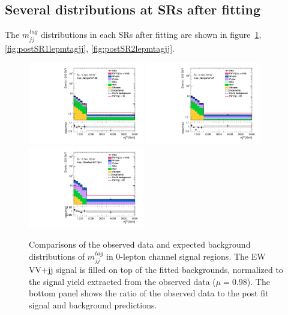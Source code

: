 \subsection{Several distributions at SRs after fitting}
The $m^{tag}_{jj}$ distributions in each SRs after fitting are shown in figure~\ref{fig:postSR0lepmtagjj}, \ref{fig:postSR1lepmtagjj}, \ref{fig:postSR2lepmtagjj}. 
\begin{figure}[]
    \centering
    \includegraphics[width=0.45\textwidth]{figures/PostFit/Region_distMTagJets_DSRVBSHP_BMin0_J0_incJet1_L0_T0_incFat1_Y6051_incTag1_Fat1_GlobalFit_unconditionnal_mu1log.pdf}
    \includegraphics[width=0.45\textwidth]{figures/PostFit/Region_distMTagJets_DSRVBSLP_BMin0_J0_incJet1_L0_T0_incFat1_Y6051_incTag1_Fat1_GlobalFit_unconditionnal_mu1log.pdf}
    \includegraphics[width=0.45\textwidth]{figures/PostFit/Region_distMTagJets_DSRVBSFid_BMin0_T0_Y6051_incTag1_J2_L0_incJet1_GlobalFit_unconditionnal_mu1log.pdf}
      \caption{Comparisons of the observed data and expected background distributions of $m^{tag}_{jj}$ in 0-lepton channel signal regions. The EW VV+jj signal is filled on top of the fitted backgrounds, normalized to the signal yield extracted from the observed data ($\mu = 0.98$). The bottom panel shows the ratio of the observed data to the post fit signal and background predictions.}
      \label{fig:postSR0lepmtagjj}
\end{figure}
